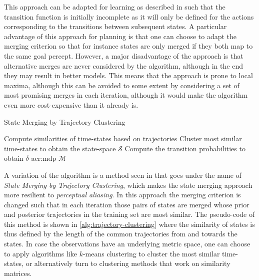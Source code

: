 This approach can be adapted for learning  as described in \cite{nikovski1999learning} such that the transition function is initially incomplete as it will only be defined for the actions corresponding to the transitions between subsequent states.
A particular advantage of this approach for planning is that one can choose to adapt the merging criterion so that for instance states are only merged if they both map to the same goal percept.
However, a major disadvantage of the approach is that alternative merges are never considered by the algorithm, although in the end they may result in better models.
This means that the approach is prone to local maxima, although this can be avoided to some extent by considering a set of most promising merges in each iteration, although it would make the algorithm even more cost-expensive than it already is.

\begin{algorithm}[t]
	\caption{State Merging by Trajectory Clustering}
	\label{alg:trajectory-clustering}
	\begin{algorithmic}[1]
		 
		\State Compute similarities of time-states based on trajectories
		\State Cluster most similar time-states to obtain the state-space $\mathcal{S}$
		\State Compute the transition probabilities to obtain $\delta$
		\State \Return \acrshort{acr:mdp} $\mathcal{M}$
	\end{algorithmic}
\end{algorithm}

A variation of the algorithm is a method seen in \cite{nikovski1999learning} that goes under the name of \textit{State Merging by Trajectory Clustering}, which makes the state merging approach more resilient to \textit{perceptual aliasing}.
In this approach the merging criterion is changed such that in each iteration those pairs of states are merged whose prior and posterior trajectories in the training set are most similar.
The pseudo-code of this method is shown in \autoref{alg:trajectory-clustering} where the similarity of states is thus defined by the length of the common trajectories from and towards the states. 
In case the observations have an underlying metric space, one can choose to apply algorithms like $k$-means clustering to cluster the most similar time-states, or alternatively turn to clustering methods that work on similarity matrices.


